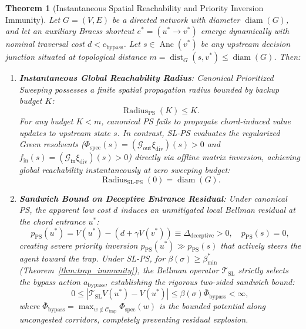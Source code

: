 \documentclass[11pt,a4paper]{article}
\newtheorem{theorem}{Theorem}
\begin{document}
\begin{theorem}[Instantaneous Spatial Reachability and Priority Inversion Immunity]
\label{thm:sweep_efficiency}
Let $G = (V, E)$ be a directed network with diameter $\operatorname{diam}(G)$, and let an auxiliary Braess shortcut $e^* = (u^* \to v^*)$ emerge dynamically with nominal traversal cost $d < c_{\text{bypass}}$. Let $s \in \operatorname{Anc}(v^*)$ be any upstream decision junction situated at topological distance $m = \operatorname{dist}_G(s, v^*) \le \operatorname{diam}(G)$. Then:
\begin{enumerate}
    \item \textbf{Instantaneous Global Reachability Radius}: Canonical Prioritized Sweeping possesses a finite spatial propagation radius bounded by backup budget $K$:
    \begin{equation}
    \label{eq:ps_reachability_radius}
    \operatorname{Radius}_{\text{PS}}(K) \le K.
    \end{equation}
    For any budget $K < m$, canonical PS fails to propagate chord-induced value updates to upstream state $s$. In contrast, SL-PS evaluates the regularized Green resolvents ($\Phi_{\text{spec}}(s) = (\mathcal{G}_{\text{out}} \xi_{\text{div}})(s) > 0$ and $f_{\text{in}}(s) = (\mathcal{G}_{\text{in}} \xi_{\text{div}})(s) > 0$) directly via offline matrix inversion, achieving global reachability instantaneously at zero sweeping budget:
    \begin{equation}
    \label{eq:sl_reachability_radius}
    \operatorname{Radius}_{\text{SL-PS}}(0) = \operatorname{diam}(G).
    \end{equation}
    
    \item \textbf{Sandwich Bound on Deceptive Entrance Residual}: Under canonical PS, the apparent low cost $d$ induces an unmitigated local Bellman residual at the chord entrance $u^*$:
    \begin{equation}
    p_{\text{PS}}(u^*) = V(u^*) - (d + \gamma V(v^*)) \equiv \Delta_{\text{deceptive}} > 0, \quad p_{\text{PS}}(s) = 0,
    \end{equation}
    creating severe priority inversion $p_{\text{PS}}(u^*) \gg p_{\text{PS}}(s)$ that actively steers the agent toward the trap. 
    Under SL-PS, for $\beta(\sigma) \ge \beta_{\min}^*$ (Theorem~\ref{thm:trap_immunity}), the Bellman operator $\mathcal{T}_{\text{SL}}$ strictly selects the bypass action $a_{\text{bypass}}$, establishing the rigorous two-sided sandwich bound:
    \begin{equation}
    \label{eq:chord_residual_sandwich}
    0 \le |\mathcal{T}_{\text{SL}} V(u^*) - V(u^*)| \le \beta(\sigma) \bar{\Phi}_{\text{bypass}} < \infty,
    \end{equation}
    where $\bar{\Phi}_{\text{bypass}} = \max_{w \notin \mathcal{C}_{\text{trap}}} \Phi_{\text{spec}}(w)$ is the bounded potential along uncongested corridors, completely preventing residual explosion.


\end{enumerate}
\end{theorem}
\end{document}
